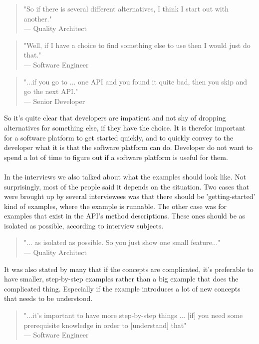 \documentclass{cslthse-msc}
\begin{document}
    \begin{quote}
        "So if there is several different alternatives, I think I start out with another."\\
        --- Quality Architect
    \end{quote}
    \begin{quote}
        "Well, if I have a choice to find something else to use then I would just do that." \\
        --- Software Engineer
    \end{quote}
    \begin{quote}
        "...if you go to ... one API and you found it quite bad, then you skip and go the next API." \\
        --- Senior Developer
    \end{quote}
    So it's quite clear that developers are impatient and not shy of dropping alternatives for something else, if they have the choice. It is therefor important for a software platform to get started quickly, and to quickly convey to the developer what it is that the software platform can do. Developer do not want to spend a lot of time to figure out if a software platform is useful for them.
    \\ \\
    In the interviews we also talked about what the examples should look like. Not surprisingly, most of the people said it depends on the situation. Two cases that were brought up by several interviewees was that there should be 'getting-started' kind of examples, where the example is runnable. The other case was for examples that exist in the API's method descriptions. These ones should be as isolated as possible, according to interview subjects.
    \begin{quote}
        "... as isolated as possible. So you just show one small feature..." \\
        --- Quality Architect
    \end{quote}
    It was also stated by many that if the concepts are complicated, it's preferable to have smaller, step-by-step examples rather than a big example that does the complicated thing. Especially if the example introduces a lot of new concepts that needs to be understood.
    \begin{quote}
        "...it's important to have more step-by-step things ... [if] you need some prerequisite knowledge in order to [understand] that" \\
        --- Software Engineer
    \end{quote}
\end{document}
